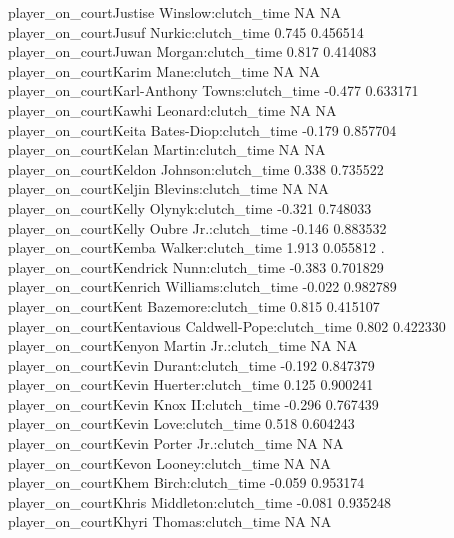 \documentclass[
  landscape]{article}
\begin{document}
{player\_on\_courtJustise Winslow:clutch\_time NA NA\\
player\_on\_courtJusuf Nurkic:clutch\_time 0.745 0.456514\\
player\_on\_courtJuwan Morgan:clutch\_time 0.817 0.414083\\
player\_on\_courtKarim Mane:clutch\_time NA NA\\
player\_on\_courtKarl-Anthony Towns:clutch\_time -0.477 0.633171\\
player\_on\_courtKawhi Leonard:clutch\_time NA NA\\
player\_on\_courtKeita Bates-Diop:clutch\_time -0.179 0.857704\\
player\_on\_courtKelan Martin:clutch\_time NA NA\\
player\_on\_courtKeldon Johnson:clutch\_time 0.338 0.735522\\
player\_on\_courtKeljin Blevins:clutch\_time NA NA\\
player\_on\_courtKelly Olynyk:clutch\_time -0.321 0.748033\\
player\_on\_courtKelly Oubre Jr.:clutch\_time -0.146 0.883532\\
player\_on\_courtKemba Walker:clutch\_time 1.913 0.055812 .\\
player\_on\_courtKendrick Nunn:clutch\_time -0.383 0.701829\\
player\_on\_courtKenrich Williams:clutch\_time -0.022 0.982789\\
player\_on\_courtKent Bazemore:clutch\_time 0.815 0.415107\\
player\_on\_courtKentavious Caldwell-Pope:clutch\_time 0.802 0.422330\\
player\_on\_courtKenyon Martin Jr.:clutch\_time NA NA\\
player\_on\_courtKevin Durant:clutch\_time -0.192 0.847379\\
player\_on\_courtKevin Huerter:clutch\_time 0.125 0.900241\\
player\_on\_courtKevin Knox II:clutch\_time -0.296 0.767439\\
player\_on\_courtKevin Love:clutch\_time 0.518 0.604243\\
player\_on\_courtKevin Porter Jr.:clutch\_time NA NA\\
player\_on\_courtKevon Looney:clutch\_time NA NA\\
player\_on\_courtKhem Birch:clutch\_time -0.059 0.953174\\
player\_on\_courtKhris Middleton:clutch\_time -0.081 0.935248\\
player\_on\_courtKhyri Thomas:clutch\_time NA NA\\
}
\end{document}
